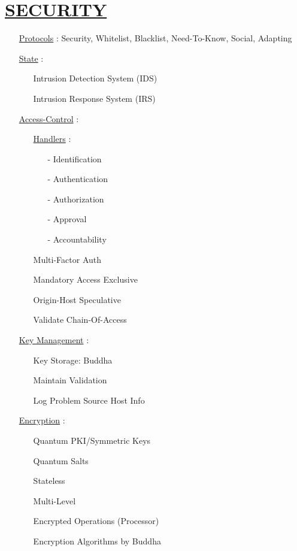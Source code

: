 \documentclass[11pt]{article}
\begin{document}
\section*{\ul{SECURITY}}
\begin{enumerate}
	\item[] \ul{Protocols} : Security, Whitelist, Blacklist, Need-To-Know, Social, Adapting
	
	\item[] \ul{State} :
	\begin{enumerate}
		\item[] Intrusion Detection System (IDS)
		\item[] Intrusion Response System (IRS)
	\end{enumerate}
	
	\item[] \ul{Access-Control} :
	\begin{enumerate}
		\item[] \ul{Handlers} :
		\begin{enumerate}
			\item[-] Identification
			\item[-] Authentication
			\item[-] Authorization
			\item[-] Approval
			\item[-] Accountability
		\end{enumerate}
	
		\item[] Multi-Factor Auth
		\item[] Mandatory Access Exclusive
		\item[] Origin-Host Speculative
		\item[] Validate Chain-Of-Access
	\end{enumerate}

	\item[] \ul{Key Management} :
	\begin{enumerate}
		\item[] Key Storage: Buddha
		\item[] Maintain Validation
		\item[] Log Problem Source Host Info
	\end{enumerate}
	
	\item[] \ul{Encryption} :
	\begin{enumerate}
		\item[] Quantum PKI/Symmetric Keys
		\item[] Quantum Salts
		\item[] Stateless
		\item[] Multi-Level
		\item[] Encrypted Operations (Processor)
		\item[] Encryption Algorithms by Buddha %
	\end{enumerate}
	

\end{enumerate}
\end{document}
